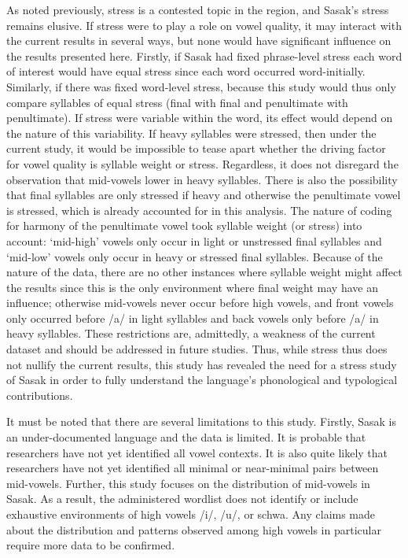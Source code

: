 \documentclass[12pt]{ouparticle}
\begin{document}
As noted previously, stress is a contested topic in the region, and Sasak's stress remains elusive. If stress were to play a role on vowel quality, it may interact with the current results in several ways, but none would have significant influence on the results presented here. Firstly, if Sasak had fixed phrase-level stress each word of interest would have equal stress since each word occurred word-initially. Similarly, if there was fixed word-level stress, because this study would thus only compare syllables of equal stress (final with final and penultimate with penultimate). If stress were variable within the word, its effect would depend on the nature of this variability. If heavy syllables were stressed, then under the current study, it would be impossible to tease apart whether the driving factor for vowel quality is syllable weight or stress. Regardless, it does not disregard the observation that mid-vowels lower in heavy syllables. There is also the possibility that final syllables are only stressed if heavy and otherwise the penultimate vowel is stressed, which is already accounted for in this analysis. The nature of coding for harmony of the penultimate vowel took syllable weight (or stress) into account: `mid-high' vowels only occur in light or unstressed final syllables and `mid-low' vowels only occur in heavy or stressed final syllables. Because of the nature of the data, there are no other instances where syllable weight might affect the results since this is the only environment where final weight may have an influence; otherwise mid-vowels never occur before high vowels, and front vowels only occurred before /a/ in light syllables and back vowels only before /a/ in heavy syllables. These restrictions are, admittedly, a weakness of the current dataset and should be addressed in future studies. Thus, while stress thus does not nullify the current results, this study has revealed the need for a stress study of Sasak in order to fully understand the language's phonological and typological contributions.

It must be noted that there are several limitations to this study. Firstly, Sasak is an under-documented language and the data is limited. It is probable that researchers have not yet identified all vowel contexts. It is also quite likely that researchers have not yet identified all minimal or near-minimal pairs between mid-vowels.  Further, this study focuses on the distribution of mid-vowels in Sasak. As a result, the administered wordlist does not identify or include exhaustive environments of high vowels /i/, /u/, or schwa. Any claims made about the distribution and patterns observed among high vowels in particular require more data to be confirmed. 
\end{document}
